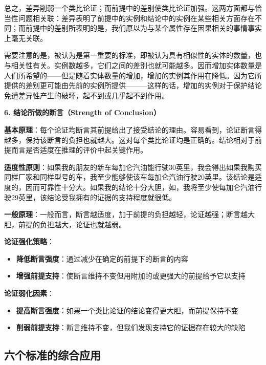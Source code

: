 总之，差异削弱一个类比论证；而前提中的差别使类比论证加强。这两方面都与恰当性问题相关联：差异表明了前提中的实例和结论中的实例在某些相关方面存在不同；而前提中的差别所表明的是，我们原以为与某个属性存在因果相关的事情事实上毫无关联。

需要注意的是，被认为是第一重要的标准，即被认为具有相似性的实体的数量，也与相关性有关。实例数越多，它们之间的差别也就可能越多。因而增加实体数量是人们所希望的——但是随着实体数量的增加，增加的实例其作用在降低。因为它所提供的差别更可能由先前的实例所提供———这样的话，增加的实例对于保护结论免遭差异性产生的破坏，起不到或几乎起不到作用。

\begin{theorembox}[title=标准六：结论断言强度的深入分析]

\textbf{6. 结论所做的断言（Strength of Conclusion）}

\textbf{基本原理}：每个论证均断言其前提给出了接受结论的理由。容易看到，论证断言得越多，保持该断言的负担也就越大。这对每个类比论证均是正确的。结论相对于前提而言是否适度在推理的评价中起关键作用。

\textbf{适度性原则}：如果我的朋友的新车每加仑汽油能行驶30英里，我会得出如果我购买同样厂家和同样型号的车，我至少能够使该车每加仑汽油行驶20英里。该结论是适度的，因而可靠性十分大。如果我的结论十分大胆，如，我将至少使每加仑汽油行驶29英里，该结论受我拥有的证据的支持程度就很低。

\textbf{一般原理}：一般而言，断言越适度，加于前提的负担越轻，论证越强；断言越大胆，前提的负担越大，论证也就越弱。

\textbf{论证强化策略}：
\begin{itemize}
\item \textbf{降低断言强度}：通过减少在确定的前提下的断言的内容
\item \textbf{增强前提支持}：使断言维持不变但用附加的或更强大的前提给予它以支持
\end{itemize}

\textbf{论证弱化因素}：
\begin{itemize}
\item \textbf{提高断言强度}：如果一个类比论证的结论变得更大胆，而前提保持不变
\item \textbf{削弱前提支持}：断言维持不变，但我们发现支持它的证据存在较大的缺陷
\end{itemize}
\end{theorembox}

\subsection{六个标准的综合应用}

